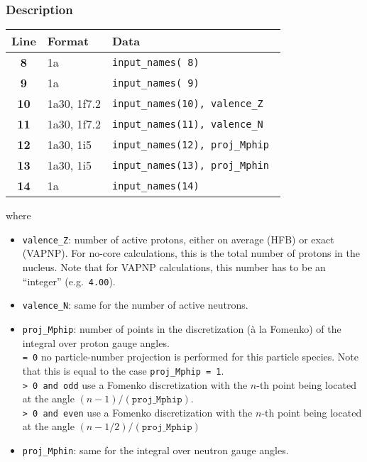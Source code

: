 \documentclass[a4paper,11pt]{article}
\newcommand{\ttt}[1]{\texttt{#1}}
\begin{document}
\subsubsection*{Description}
\begin{center}
\begin{tabular}{|c|l|l|}
\hline
Line & Format & Data \\
\hline
 \textbf{ 8}   & 1a           & \tt input\_names( 8)              \\
 \textbf{ 9}   & 1a           & \tt input\_names( 9)              \\
 \textbf{10}   & 1a30, 1f7.2  & \tt input\_names(10), valence\_Z  \\
 \textbf{11}   & 1a30, 1f7.2  & \tt input\_names(11), valence\_N  \\
 \textbf{12}   & 1a30, 1i5    & \tt input\_names(12), proj\_Mphip \\
 \textbf{13}   & 1a30, 1i5    & \tt input\_names(13), proj\_Mphin \\
 \textbf{14}   & 1a           & \tt input\_names(14)              \\
\hline
\end{tabular}
\end{center}
where
\begin{itemize}
 \item \ttt{valence\_Z}: number of active protons, either on average (HFB) or exact (VAPNP). For no-core calculations, this is the total number
  of protons in the nucleus. Note that for VAPNP calculations, this number has to be an ``integer'' (e.g.\ \ttt{4.00}).
 \item \ttt{valence\_N}: same for the number of active neutrons. 
 \item \ttt{proj\_Mphip}: number of points in the discretization (à la Fomenko) of the integral over proton gauge angles. \\[0.05cm]
  \ttt{= 0\:} no particle-number projection is performed for this particle species. Note that this is equal to the case \ttt{proj\_Mphip = 1}. \\[0.05cm]
  \ttt{> 0 and odd\:} use a Fomenko discretization with the $n$-th point being located at the angle $(n-1)/(\ttt{proj\_Mphip})$. \\[0.05cm]
  \ttt{> 0 and even\:} use a Fomenko discretization with the $n$-th point being located at the angle $(n-1/2)/(\ttt{proj\_Mphip})$ 
 \item \ttt{proj\_Mphin}: same for the integral over neutron gauge angles. 

\end{itemize}
\end{document}
